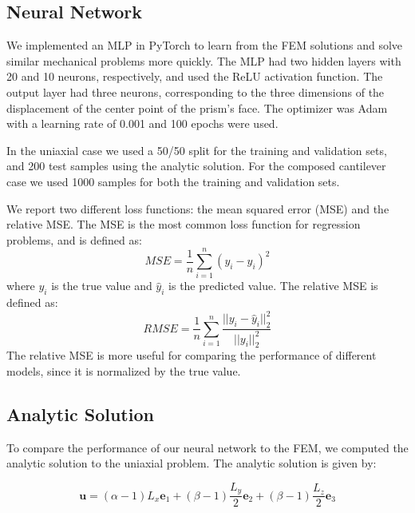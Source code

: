 \documentclass[oneside,a4paper,english,links]{amca}
\begin{document}
\subsection{Neural Network}
We implemented an MLP in PyTorch to learn from the FEM solutions and solve similar mechanical problems more quickly. The MLP had two hidden layers with 20 and 10 neurons, respectively, and used the ReLU activation function. The output layer had three neurons, corresponding to the three dimensions of the displacement of the center point of the prism's face. The optimizer was Adam with a learning rate of 0.001 and 100 epochs were used. 

In the uniaxial case we used a 50/50 split for the training and validation sets, and 200 test samples using the analytic solution. For the composed cantilever case we used 1000 samples for both the training and validation sets.

We report two different loss functions: the mean squared error (MSE) and the relative MSE. The MSE is the most common loss function for regression problems, and is defined as:
\begin{equation}
\label{eq:MSE}
MSE = \frac{1}{n} \sum_{i=1}^{n} (y_i - \hat{y}_i)^2
\end{equation}
where $y_i$ is the true value and $\hat{y}_i$ is the predicted value. The relative MSE is defined as:
\begin{equation}
\label{eq:RMSE}
RMSE = \frac{1}{n} \sum_{i=1}^{n} \frac{||y_i - \hat{y}_i||_2^2}{||y_i||_2^2}
\end{equation}
The relative MSE is more useful for comparing the performance of different models, since it is normalized by the true value.

\subsection{Analytic Solution}
To compare the performance of our neural network to the FEM, we computed the analytic solution to the uniaxial problem. The analytic solution is given by:

\begin{equation}
\label{eq:analytic_solution}
\boldsymbol{u} = 
(\alpha - 1)L_x \boldsymbol{e}_1 
+   
(\beta - 1) \frac{L_y}{2}  \boldsymbol{e}_2 
+   
(\beta - 1)\frac{L_z}{2} \boldsymbol{e}_3 
\end{equation}
\end{document}

